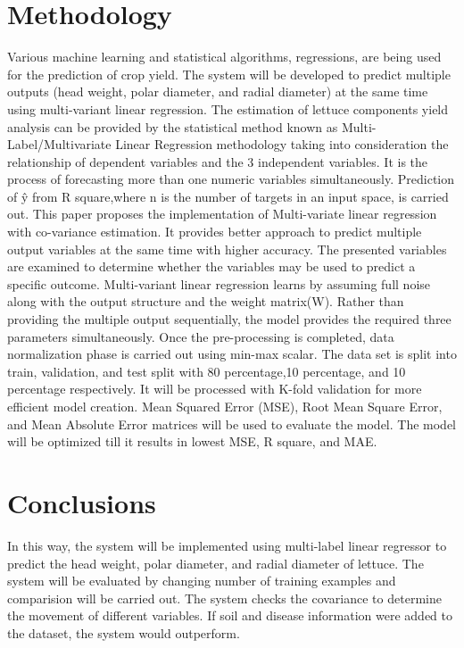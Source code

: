 \documentclass{article}
\begin{document}
\section{Methodology}
Various machine learning and statistical algorithms, regressions, are being used for the prediction of crop yield. The system will be developed to predict multiple outputs (head weight, polar diameter, and radial diameter) at the same time using multi-variant linear regression. The estimation of lettuce components yield analysis can be provided by the statistical method known as Multi-Label/Multivariate Linear Regression methodology taking into consideration the relationship of dependent variables and the 3 independent variables. It is the process of forecasting more than one numeric variables simultaneously. Prediction of \^y from R square,where n is the number of targets in an input space, is carried out. This paper proposes the implementation of Multi-variate linear regression with co-variance estimation. It provides better approach to predict multiple output variables at the same time with higher accuracy. The presented variables are examined to determine whether the variables may be used to predict a specific outcome. Multi-variant linear regression learns by assuming full noise along with the output structure and the weight matrix(W). Rather than providing the multiple output sequentially, the model provides the required three parameters simultaneously.
Once the pre-processing is completed, data normalization phase is carried out using min-max scalar. The data set is split into train, validation, and test split with 80 percentage,10 percentage, and 10 percentage respectively. It will be processed with K-fold validation for more efficient model creation. Mean Squared Error (MSE), Root Mean Square Error, and Mean Absolute Error matrices will be used to evaluate the model. The model will be optimized till it results in lowest MSE, R square, and MAE.


\section{Conclusions}
In this way, the system will be implemented using multi-label linear regressor to predict the head weight, polar diameter, and radial diameter of lettuce. The system will be evaluated by changing number of training examples and comparision will be carried out. The system checks the covariance to determine the movement of different variables. If soil and disease information were added to the dataset, the system would outperform.


\end{document}
